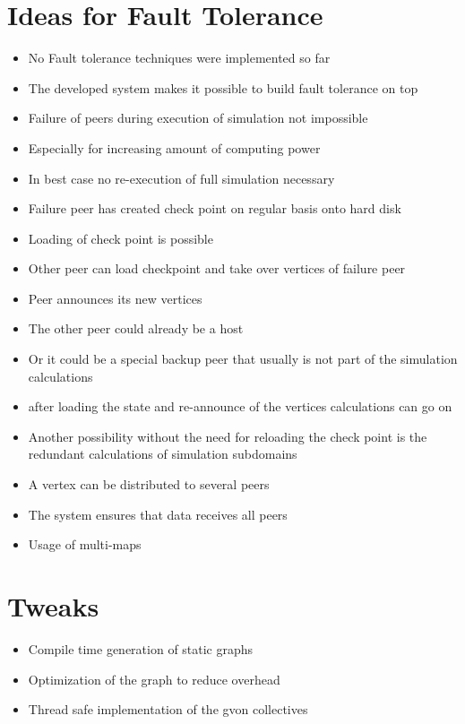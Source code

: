 \section*{Ideas for Fault Tolerance}
\begin{itemize}
\item No Fault tolerance techniques were implemented so far

\item The developed system makes it possible to build
  fault tolerance on top

\item Failure of peers during execution of simulation not impossible
\item Especially for increasing amount of computing power
\item In best case no re-execution of full simulation necessary


\item Failure peer has created check point on regular basis onto hard disk
\item Loading of check point is possible
\item Other peer can load checkpoint and take over vertices of failure
  peer
\item Peer announces its new vertices
\item The other peer could already be a host
\item Or it could be a special backup peer that usually
  is not part of the simulation calculations
\item after loading the state and re-announce of the vertices
  calculations can go on


\item Another possibility without the need for reloading the check point
  is the redundant calculations of simulation subdomains
\item A vertex can be distributed to several peers
\item The system ensures that data receives all peers
\item Usage of multi-maps

\end{itemize}

\section*{Tweaks}
\begin{itemize}
\item Compile time generation of static graphs
\item Optimization of the graph to reduce overhead
\item Thread safe implementation of the gvon collectives
\end{itemize}

\cleardoublepage

